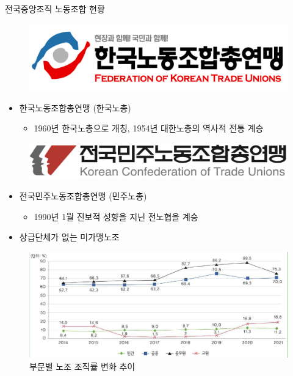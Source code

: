 \documentclass[aspectratio=169,xcolor=dvipsnames,handout]{beamer}
\begin{document}
\begin{frame}{전국중앙조직 노동조합 현황}
        \begin{figure}
            \includegraphics[width=.4\textwidth]{pic/한국노총로고.png}
        \end{figure}
    \begin{itemize}[<+->]
        \item 한국노동조합총연맹 (한국노총)
        \begin{itemize}[<+->]
            \item 1960년 한국노총으로 개칭, 1954년 대한노총의 역사적 전통 계승
        \end{itemize}
    \end{itemize}
        \begin{figure}
            \includegraphics[width=.4\textwidth]{pic/민주노총로고.png}
        \end{figure}
    \begin{itemize}[<+->]
        \item 전국민주노동조합총연맹 (민주노총)
        \begin{itemize}[<+->]
            \item 1990년 1월 진보적 성향을 지닌 전노협을 계승
        \end{itemize}
        \item 상급단체가 없는 미가맹노조
    \end{itemize}
\end{frame}

\begin{frame}
\centering
\begin{figure}
    \includegraphics[width=.8\textwidth]{pic/부문별노조조직률변화추이.png}
    \caption{부문별 노조 조직률 변화 추이}
\end{figure}
\end{frame}
\end{document}
